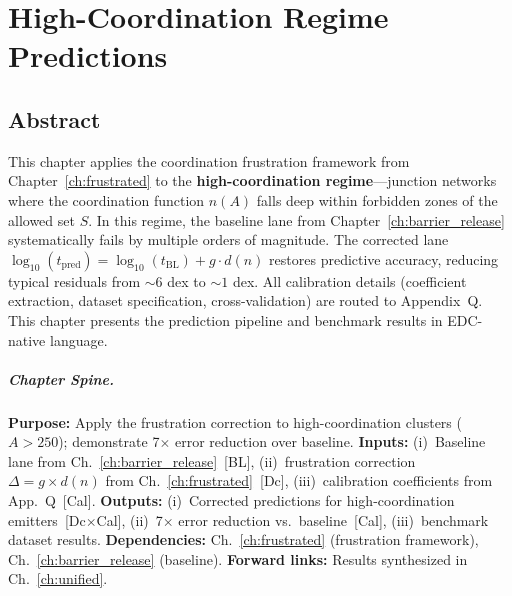 
\chapter{High-Coordination Regime Predictions}
\label{ch:high_coord}


\section*{Abstract}

This chapter applies the coordination frustration framework from
Chapter~\ref{ch:frustrated} to the \textbf{high-coordination regime}---junction
networks where the coordination function $n(A)$ falls deep within forbidden
zones of the allowed set $S$. In this regime, the baseline lane from
Chapter~\ref{ch:barrier_release} systematically fails by multiple orders of
magnitude. The corrected lane $\log_{10}(t_{\text{pred}}) = \log_{10}(t_{\text{BL}})
+ g \cdot d(n)$ restores predictive accuracy, reducing typical residuals from
$\sim 6$ dex to $\sim 1$ dex. All calibration details (coefficient extraction,
dataset specification, cross-validation) are routed to Appendix~Q. This chapter
presents the prediction pipeline and benchmark results in EDC-native language.

\paragraph{Chapter Spine.}
\textbf{Purpose:} Apply the frustration correction to high-coordination clusters
($A > 250$); demonstrate 7$\times$ error reduction over baseline.
\textbf{Inputs:} (i)~Baseline lane from Ch.~\ref{ch:barrier_release}~[BL],
(ii)~frustration correction $\Delta = g \times d(n)$ from Ch.~\ref{ch:frustrated}~[Dc],
(iii)~calibration coefficients from App.~Q~[Cal].
\textbf{Outputs:} (i)~Corrected predictions for high-coordination emitters~[Dc$\times$Cal],
(ii)~7$\times$ error reduction vs.\ baseline~[Cal], (iii)~benchmark dataset results.
\textbf{Dependencies:} Ch.~\ref{ch:frustrated} (frustration framework), Ch.~\ref{ch:barrier_release} (baseline).
\textbf{Forward links:} Results synthesized in Ch.~\ref{ch:unified}.

